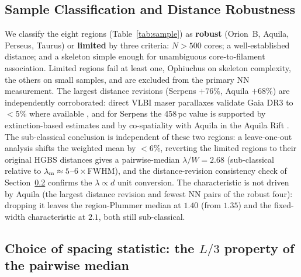 \documentclass[usenatbib,twoside,twocolumn]{mnras}
\begin{document}
\subsection{Sample Classification and Distance Robustness}
\label{sec:distance_uncertainties}

We classify the eight regions (Table~\ref{tab:sample}) as \textbf{robust} (Orion~B, Aquila, Perseus, Taurus) or \textbf{limited} by three criteria: $N>500$ cores; a well-established distance; and a skeleton simple enough for unambiguous core-to-filament association. Limited regions fail at least one, Ophiuchus on skeleton complexity, the others on small samples, and are excluded from the primary NN measurement. The largest distance revisions (Serpens $+76\%$, Aquila $+68\%$) are independently corroborated: direct VLBI maser parallaxes validate Gaia DR3 to $<5\%$ where available \citep{Kounkel2018,Xu2021,OrtizLeon2018,OrtizLeon2017}, and for Serpens the 458\,pc value is supported by extinction-based estimates \citep[$440$--$460$\,pc;][]{Yan2022,Green2024} and by co-spatiality with Aquila in the Aquila Rift \citep{Zucker2020}. The sub-classical conclusion is independent of these two regions: a leave-one-out analysis shifts the weighted mean by $<6\%$, reverting the limited regions to their original HGBS distances gives a pairwise-median $\lambda/W=2.68$ (sub-classical relative to $\lambda_{\rm m}\approx5$--$6\times$FWHM), and the distance-revision consistency check of Section~\ref{sec:statistics} confirms the $\lambda\propto d$ unit conversion. The characteristic is not driven by Aquila (the largest distance revision and fewest NN pairs of the robust four): dropping it leaves the region-Plummer median at $1.40$ (from $1.35$) and the fixed-width characteristic at $2.1$, both still sub-classical.


\subsection{Choice of spacing statistic: the $L/3$ property of the pairwise median}
\label{sec:statistics}
\end{document}
